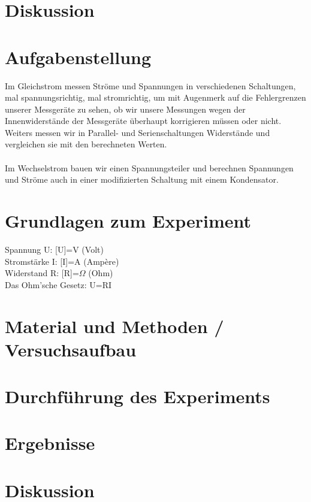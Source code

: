 \documentclass{article}
\begin{document}
\section{Diskussion}


\section{Aufgabenstellung}
Im Gleichstrom messen Ströme und Spannungen in verschiedenen Schaltungen, mal spannungsrichtig, mal stromrichtig, um mit Augenmerk auf die Fehlergrenzen unserer Messgeräte zu sehen, ob wir unsere Messungen wegen der Innenwiderstände der Messgeräte überhaupt korrigieren müssen oder nicht.\\
Weiters messen wir in Parallel- und Serienschaltungen Widerstände und vergleichen sie mit den berechneten Werten.\\
\\
Im Wechselstrom bauen wir einen Spannungsteiler und berechnen Spannungen und Ströme auch in einer modifizierten Schaltung mit einem Kondensator.

\section{Grundlagen zum Experiment}
Spannung U: [U]=V (Volt)\\
Stromstärke I: [I]=A (Ampère)\\
Widerstand R: [R]=$\Omega$ (Ohm)\\

Das Ohm'sche Gesetz: U=RI

\section{Material und Methoden / Versuchsaufbau}

\section{Durchführung des Experiments}

\section{Ergebnisse}

\section{Diskussion}
\end{document}
